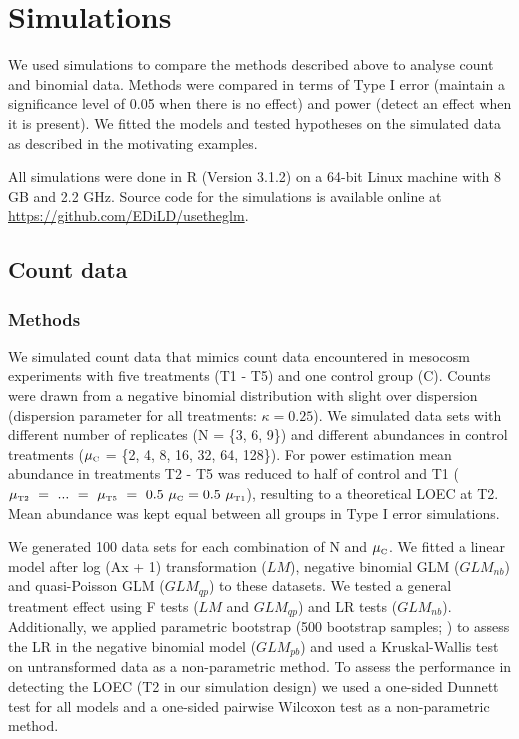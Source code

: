 \documentclass{scrartcl}
\begin{document}
\section{Simulations}
\label{sec:sim}
We used simulations to compare the methods described above to analyse count and binomial data.
Methods were compared in terms of Type I error (maintain a significance level of 0.05 when there is no effect) and power (detect an effect when it is present). 
We fitted the models and tested hypotheses on the simulated data as described in the motivating examples.

All simulations were done in R (Version 3.1.2) \citep{r_core_team_r:_2014} on a 64-bit Linux machine with 8 GB and 2.2 GHz.
Source code for the simulations is available online at \url{https://github.com/EDiLD/usetheglm}.

\subsection{Count data}
\subsubsection{Methods}
We simulated count data that mimics count data encountered in mesocosm experiments with five treatments (T1 - T5) and one control group (C).
Counts were drawn from a negative binomial distribution with slight over dispersion (dispersion parameter for all treatments: $\kappa = 0.25$).
We simulated data sets with different number of replicates (N = \{3, 6, 9\}) and different abundances in control treatments ($\mu_\text{\tiny C}$ = \{2, 4, 8, 16, 32, 64, 128\}). 
For power estimation mean abundance in treatments T2 - T5 was reduced to half of control and T1 ($\mu_\text{\tiny T2}~=~...~=~\mu_\text{\tiny T5}~=~0.5~\mu_\text{\tiny C} = 0.5~\mu_\text{\tiny T1}$), resulting to a theoretical LOEC at T2.
Mean abundance was kept equal between all groups in Type I error simulations.

We generated 100 data sets for each combination of N and $\mu_\text{\tiny C}$. 
We fitted a linear model after log (Ax + 1) transformation ($LM$), negative binomial GLM ($GLM_{nb}$) and quasi-Poisson GLM ($GLM_{qp}$) to these datasets. 
We tested a general treatment effect using F tests ($LM$ and $GLM_{qp}$) and LR tests ($GLM_{nb}$). Additionally, we applied parametric bootstrap (500 bootstrap samples; \citet{faraway_extending_2006}) to assess the LR in the negative binomial model ($GLM_{pb}$) and used a Kruskal-Wallis test on untransformed data as a non-parametric method.
To assess the performance in detecting the LOEC (T2 in our simulation design) we used a one-sided Dunnett test for all models and a one-sided pairwise Wilcoxon test as a non-parametric method.
 
\end{document}
